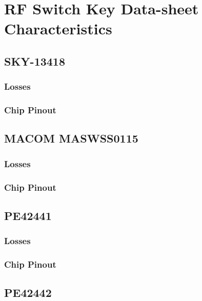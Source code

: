 \documentclass[12pt,openany,a4paper]{book}
\begin{document}




\appendix
{}


\chapter{RF Switch Key Data-sheet Characteristics}
\section{SKY-13418}
\subsection{Losses}

\subsection{Chip Pinout}


\section{MACOM MASWSS0115}
\subsection{Losses}

\subsection{Chip Pinout}



\section{PE42441}
\subsection{Losses}

\subsection{Chip Pinout}



\section{PE42442}
\end{document}

